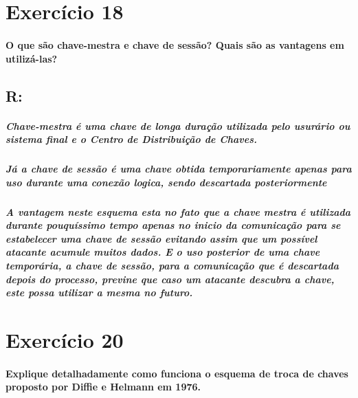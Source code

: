 \documentclass[10pt,a4paper]{report}
\begin{document}
\section*{Exercício 18}
\paragraph{O que são chave-mestra e chave de sessão? Quais são as vantagens em utilizá-las?}
\subsection*{R:}
\subparagraph{Chave-mestra é uma chave de longa duração utilizada pelo usurário ou sistema final e o Centro de Distribuição de Chaves.}
\subparagraph{Já a chave de sessão é uma chave obtida temporariamente apenas para uso durante uma conexão logica, sendo descartada posteriormente}
\subparagraph{A vantagem neste esquema esta no fato que a chave mestra é utilizada durante pouquíssimo tempo apenas no inicio da comunicação para se estabelecer uma chave de sessão evitando assim que um possível atacante acumule muitos dados. E o uso posterior de uma chave temporária, a chave de sessão, para a comunicação que é descartada depois do processo, previne que caso um atacante descubra a chave, este possa utilizar a mesma no futuro.}

\section*{Exercício 20}
\paragraph{Explique detalhadamente como funciona o esquema de troca de chaves proposto por Diffie e Helmann em 1976.}
\end{document}
